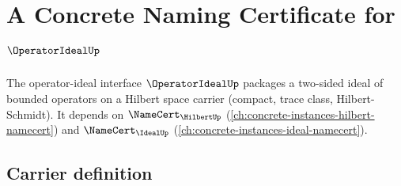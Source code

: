 \chapter{A Concrete Naming Certificate for $\OperatorIdealUp$}
\label{ch:concrete-instances-operatorideal-namecert}

The operator-ideal interface $\OperatorIdealUp$ packages a two-sided ideal of bounded operators on a Hilbert space carrier (compact, trace class, Hilbert-Schmidt). It depends on $\NameCert_{\HilbertUp}$ (\autoref{ch:concrete-instances-hilbert-namecert}) and $\NameCert_{\IdealUp}$ (\autoref{ch:concrete-instances-ideal-namecert}).

\section{Carrier definition}
\label{sec:operatorideal-carrier}

